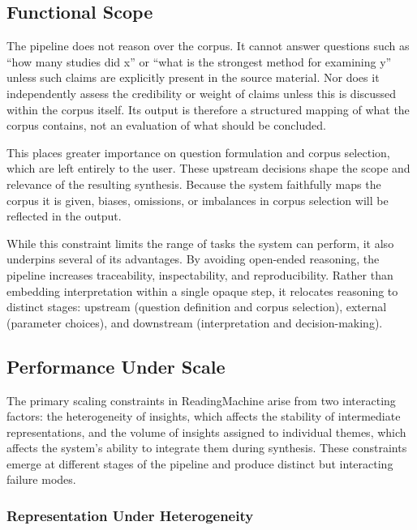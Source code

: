 \documentclass[
  11pt,
]{article}
\begin{document}
\subsection{Functional Scope}\label{functional-scope}

The pipeline does not reason over the corpus. It cannot answer questions
such as ``how many studies did x'' or ``what is the strongest method for
examining y'' unless such claims are explicitly present in the source
material. Nor does it independently assess the credibility or weight of
claims unless this is discussed within the corpus itself. Its output is
therefore a structured mapping of what the corpus contains, not an
evaluation of what should be concluded.

This places greater importance on question formulation and corpus
selection, which are left entirely to the user. These upstream decisions
shape the scope and relevance of the resulting synthesis. Because the
system faithfully maps the corpus it is given, biases, omissions, or
imbalances in corpus selection will be reflected in the output.

While this constraint limits the range of tasks the system can perform,
it also underpins several of its advantages. By avoiding open-ended
reasoning, the pipeline increases traceability, inspectability, and
reproducibility. Rather than embedding interpretation within a single
opaque step, it relocates reasoning to distinct stages: upstream
(question definition and corpus selection), external (parameter
choices), and downstream (interpretation and decision-making).

\subsection{Performance Under Scale}\label{performance-under-scale}

The primary scaling constraints in ReadingMachine arise from two
interacting factors: the heterogeneity of insights, which affects the
stability of intermediate representations, and the volume of insights
assigned to individual themes, which affects the system's ability to
integrate them during synthesis. These constraints emerge at different
stages of the pipeline and produce distinct but interacting failure
modes.

\subsubsection{Representation Under
Heterogeneity}\label{representation-under-heterogeneity}
\end{document}
